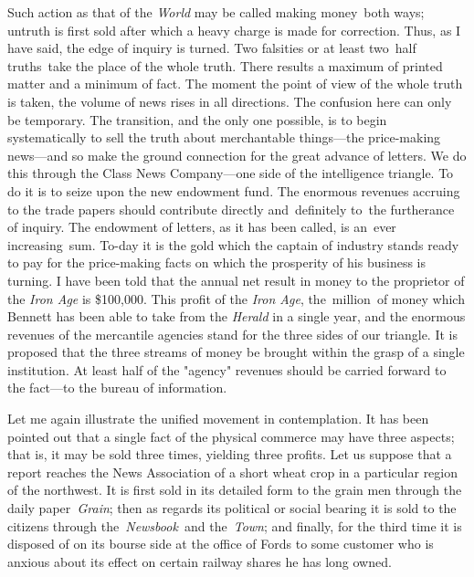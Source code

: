 \documentclass[twoside,symmetric,nobib,justified]{tufte-book}
\begin{document}
Such action as that of the \emph{World} may be called making money~both
ways; untruth is first sold after which a heavy charge is made for
correction. Thus, as I have said, the edge of inquiry is turned. Two
falsities or at least two~half truths~take the place of the whole truth.
There results a maximum of printed matter and a minimum of fact. The
moment the point of view of the whole truth is taken, the volume of news
rises in all directions. The confusion here can only be temporary. The
transition, and the only one possible, is to begin systematically to
sell the truth about merchantable things---the price-making news---and
so make the ground connection for the great advance of letters. We do
this through the Class News Company---one side of the intelligence
triangle. To do it is to seize upon the new endowment fund. The enormous
revenues accruing to the trade papers should contribute directly
and~definitely to~the furtherance of inquiry. The endowment of letters,
as it has been called, is an~ever increasing~sum. To-day it is the gold
which the captain of industry stands ready to pay for the price-making
facts on which the prosperity of his business is turning. I have been
told that the annual net result in money to the proprietor of the
\emph{Iron Age} is \$100,000. This profit of the \emph{Iron Age},
the~million~of money which Bennett has been able to take from the
\emph{Herald} in a single year, and the enormous revenues of the
mercantile agencies stand for the three sides of our triangle. It is
proposed that the three streams of money be brought within the grasp of
a single institution. At least half of the "agency" revenues should be
carried forward to the fact---to the bureau of information.~

Let me again illustrate the unified movement in contemplation. It has
been pointed out that a single fact of the physical commerce may have
three aspects; that is, it may be sold three times, yielding three
profits. Let us suppose that a report reaches the News Association of a
short wheat crop in a particular region of the northwest. It is first
sold in its detailed form to the grain men through the daily
paper\emph{~Grain}; then as regards its political or social bearing it
is sold to the citizens through the~\emph{Newsbook~}and the~\emph{Town};
and finally, for the third time it is disposed of on its bourse side at
the office of Fords to some customer who is anxious about its effect on
certain railway shares he has long owned.~
\end{document}
